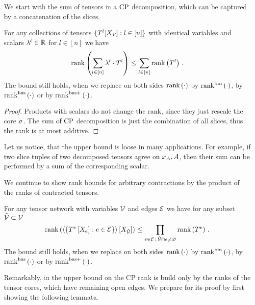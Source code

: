 
We start with the sum of tensors in a $\mathrm{CP}$ decomposition, which can be captured by a concatenation of the slices.

\begin{theorem}
    \label{the:CPrankSumBound}
    For any collections of tensors $\{T^{l}[X_{\mathcal{V}}] : l \in [n]\}$ with identical variables and scalars $\lambda^{l} \in \mathbb{R}$ for $l\in[n]$  we have
    \[ \mathrm{rank}\left(\sum_{l \in [n]} \lambda^{l} \cdot T^{l}\right) \leq \sum_{l\in[n]}  \mathrm{rank}\left(T^{l}\right)  \, . \]
    The bound still holds, when we replace on both sides $\mathrm{rank}\left(\cdot\right)$ by $\mathrm{rank}^{\mathrm{bin}}\left(\cdot\right)$, by $\mathrm{rank}^{\mathrm{bas}}\left(\cdot\right)$ or by $\mathrm{rank}^{\mathrm{bas+}}\left(\cdot\right)$.
\end{theorem}
\begin{proof}
    Products with scalars do not change the rank, since they just rescale the core $\sigma$.
    The sum of $\mathrm{CP}$ decomposition is just the combination of all slices, thus the rank is at most additive.
\end{proof}

Let us notice, that the upper bound is loose in many applications.
For example, if two slice tuples of two decomposed tensors agree on $x_{A},A$, then their sum can be performed by a sum of the corresponding scalar.



We continue to show rank bounds for arbitrary contractions by the product of the ranks of contracted tensors.

\begin{theorem}
    \label{the:CPrankContractionBound}
    For any tensor network with variables $\mathcal{V}$ and edges $\mathcal{E}$ we have for any subset $\tilde{\mathcal{V}}\subset\mathcal{V}$
    \begin{align*}
        \mathrm{rank}\left(\left\langle \{T^{e}\left[X_{e}\right] : e\in\mathcal{E} \}\right\rangle \left[ X_{\tilde{\mathcal{V}}} \right]\right) \leq
        \prod_{e\in\mathcal{E} \, : \, \tilde{\mathcal{V}}\cap e \neq \varnothing} \mathrm{rank}\left(T^{e}\right) \, .
    \end{align*}
    The bound still holds, when we replace on both sides $\mathrm{rank}\left(\cdot\right)$ by $\mathrm{rank}^{\mathrm{bin}}\left(\cdot\right)$, by $\mathrm{rank}^{\mathrm{bas}}\left(\cdot\right)$ or by $\mathrm{rank}^{\mathrm{bas+}}\left(\cdot\right)$.
\end{theorem}

Remarkably, in  the upper bound on the CP rank is build only by the ranks of the tensor cores, which have remaining open edges.
We prepare for its proof by first showing the following lemmata.

